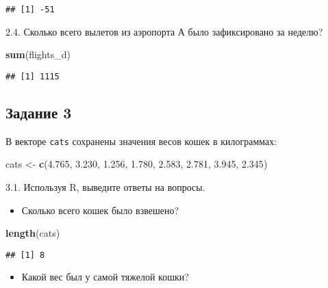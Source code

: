 \documentclass[
]{article}
\newenvironment{Shaded}{\begin{snugshade}}{\end{snugshade}}
\newcommand{\FloatTok}[1]{\textcolor[rgb]{0.00,0.00,0.81}{#1}}
\newcommand{\KeywordTok}[1]{\textcolor[rgb]{0.13,0.29,0.53}{\textbf{#1}}}
\newcommand{\NormalTok}[1]{#1}
\newcommand{\StringTok}[1]{\textcolor[rgb]{0.31,0.60,0.02}{#1}}
\providecommand{\tightlist}{%
  \setlength{\itemsep}{0pt}\setlength{\parskip}{0pt}}
\begin{document}
\begin{verbatim}
## [1] -51
\end{verbatim}

2.4. Сколько всего вылетов из аэропорта А было зафиксировано за неделю?

\begin{Shaded}
\begin{Highlighting}[]
\KeywordTok{sum}\NormalTok{(flights_d)}
\end{Highlighting}
\end{Shaded}

\begin{verbatim}
## [1] 1115
\end{verbatim}

\hypertarget{ux437ux430ux434ux430ux43dux438ux435-3}{%
\subsection{Задание 3}\label{ux437ux430ux434ux430ux43dux438ux435-3}}

В векторе \texttt{cats} сохранены значения весов кошек в килограммах:

\begin{Shaded}
\begin{Highlighting}[]
\NormalTok{cats <-}\StringTok{ }\KeywordTok{c}\NormalTok{(}\FloatTok{4.765}\NormalTok{, }\FloatTok{3.230}\NormalTok{, }\FloatTok{1.256}\NormalTok{, }\FloatTok{1.780}\NormalTok{, }\FloatTok{2.583}\NormalTok{, }\FloatTok{2.781}\NormalTok{, }\FloatTok{3.945}\NormalTok{, }\FloatTok{2.345}\NormalTok{)}
\end{Highlighting}
\end{Shaded}

3.1. Используя R, выведите ответы на вопросы.

\begin{itemize}
\tightlist
\item
  Сколько всего кошек было взвешено?
\end{itemize}

\begin{Shaded}
\begin{Highlighting}[]
\KeywordTok{length}\NormalTok{(cats)}
\end{Highlighting}
\end{Shaded}

\begin{verbatim}
## [1] 8
\end{verbatim}

\begin{itemize}
\tightlist
\item
  Какой вес был у самой тяжелой кошки?
\end{itemize}
\end{document}
